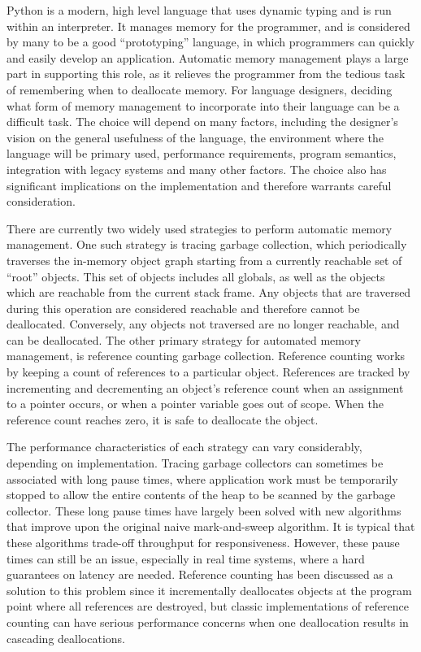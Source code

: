 \documentclass{sigplanconf}
\begin{document}
Python is a modern, high level language that uses dynamic typing and is run within an interpreter.  It manages memory for the programmer, and is considered by many to be a good ``prototyping'' language, in which programmers can quickly and easily develop an application.   Automatic memory management plays a large part in supporting this role, as it relieves the programmer from the tedious task of remembering when to deallocate memory.  For language designers, deciding what form of memory management to incorporate into their language can be a difficult task.  The choice will depend on many factors, including the designer's vision on the general usefulness of the language, the environment where the language will be primary used, performance requirements, program semantics, integration with legacy systems and many other factors.  The choice also has significant implications on the implementation and therefore warrants careful consideration.  

There are currently two widely used strategies to perform automatic memory management.  One such strategy is tracing garbage collection, which periodically traverses the in-memory object graph starting from a currently reachable set of ``root'' objects.  This set of objects includes all globals, as well as the objects which are reachable from the current stack frame.  Any objects that are traversed during this operation are considered reachable and therefore cannot be deallocated.  Conversely, any objects not traversed are no longer reachable, and can be deallocated.  The other primary strategy for automated memory management, is reference counting garbage collection. Reference counting works by keeping a count of references to a particular object.  References are tracked by incrementing and decrementing an object's reference count when an assignment to a pointer occurs, or when a pointer variable goes out of scope.  When the reference count reaches zero, it is safe to deallocate the object.

The performance characteristics of each strategy can vary considerably, depending on implementation.   Tracing garbage collectors can sometimes be associated with long pause times, where application work must be temporarily stopped to allow the entire contents of the heap to be scanned by the garbage collector.  These long pause times have largely been solved with new algorithms that improve upon the original naive mark-and-sweep algorithm.  It is typical that these algorithms trade-off throughput for responsiveness.  However, these pause times can still be an issue, especially in real time systems, where a hard guarantees on latency are needed.  Reference counting has been discussed as a solution to this problem since it incrementally deallocates objects at the program point where all references are destroyed, but classic implementations of reference counting can have serious performance concerns when one deallocation results in cascading deallocations\cite{boehm}.  
\end{document}
